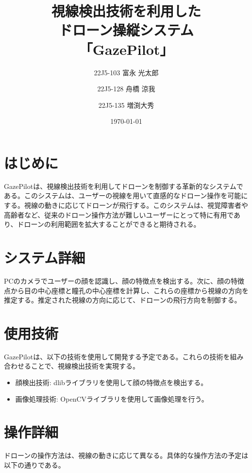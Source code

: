\documentclass[a4paper, 12pt]{article}
\title{視線検出技術を利用した\\ドローン操縦システム\\「GazePilot」}
\begin{document}
\author{22J5-103 富永 光太郎 \and 22J5-128 舟橋 涼我 \and 22J5-135 増渕大秀}
\date{\today}


\maketitle


\section{はじめに}
GazePilotは、視線検出技術を利用してドローンを制御する革新的なシステムである。このシステムは、ユーザーの視線を用いて直感的なドローン操作を可能にする。視線の動きに応じてドローンが飛行する。このシステムは、視覚障害者や高齢者など、従来のドローン操作方法が難しいユーザーにとって特に有用であり、ドローンの利用範囲を拡大することができると期待される。

\section{システム詳細}
PCのカメラでユーザーの顔を認識し、顔の特徴点を検出する。次に、顔の特徴点から目の中心座標と瞳孔の中心座標を計算し、これらの座標から視線の方向を推定する。推定された視線の方向に応じて、ドローンの飛行方向を制御する。

\section{使用技術}
GazePilotは、以下の技術を使用して開発する予定である。これらの技術を組み合わせることで、視線検出技術を実現する。
\begin{itemize}
    \item 顔検出技術: dlibライブラリを使用して顔の特徴点を検出する。
    \item 画像処理技術: OpenCVライブラリを使用して画像処理を行う。
\end{itemize}

\newpage
\section{操作詳細}
ドローンの操作方法は、視線の動きに応じて異なる。具体的な操作方法の予定は以下の通りである。
\end{document}
